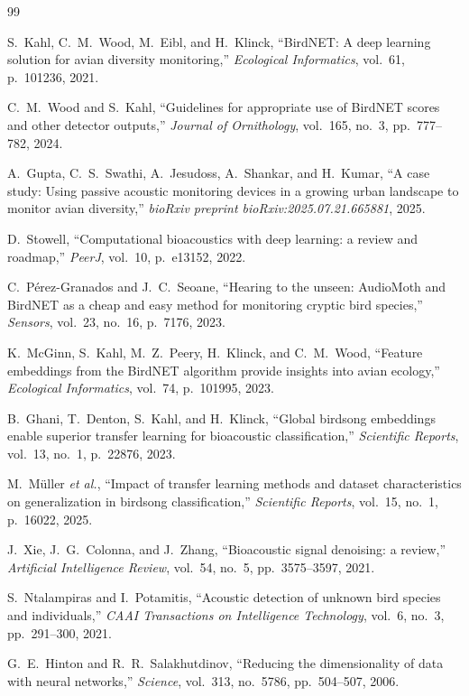 \documentclass[a4paper,12pt]{article}
\begin{document}
\begin{thebibliography}{99}

S.~Kahl, C.~M.~Wood, M.~Eibl, and H.~Klinck,
``BirdNET: A deep learning solution for avian diversity monitoring,''
\textit{Ecological Informatics}, vol.~61, p.~101236, 2021.

C.~M.~Wood and S.~Kahl,
``Guidelines for appropriate use of BirdNET scores and other detector outputs,''
\textit{Journal of Ornithology}, vol.~165, no.~3, pp.~777--782, 2024.

A.~Gupta, C.~S.~Swathi, A.~Jesudoss, A.~Shankar, and H.~Kumar,
``A case study: Using passive acoustic monitoring devices in a growing urban landscape
to monitor avian diversity,''
\textit{bioRxiv preprint bioRxiv:2025.07.21.665881}, 2025.

D.~Stowell,
``Computational bioacoustics with deep learning: a review and roadmap,''
\textit{PeerJ}, vol.~10, p.~e13152, 2022.

C.~P\'erez-Granados and J.~C.~Seoane,
``Hearing to the unseen: AudioMoth and BirdNET as a cheap and easy method for monitoring
cryptic bird species,''
\textit{Sensors}, vol.~23, no.~16, p.~7176, 2023.

K.~McGinn, S.~Kahl, M.~Z.~Peery, H.~Klinck, and C.~M.~Wood,
``Feature embeddings from the BirdNET algorithm provide insights into avian ecology,''
\textit{Ecological Informatics}, vol.~74, p.~101995, 2023.

B.~Ghani, T.~Denton, S.~Kahl, and H.~Klinck,
``Global birdsong embeddings enable superior transfer learning for bioacoustic classification,''
\textit{Scientific Reports}, vol.~13, no.~1, p.~22876, 2023.

M.~M\"{u}ller \textit{et al.},
``Impact of transfer learning methods and dataset characteristics on generalization in
birdsong classification,''
\textit{Scientific Reports}, vol.~15, no.~1, p.~16022, 2025.

J.~Xie, J.~G.~Colonna, and J.~Zhang,
``Bioacoustic signal denoising: a review,''
\textit{Artificial Intelligence Review}, vol.~54, no.~5, pp.~3575--3597, 2021.

S.~Ntalampiras and I.~Potamitis,
``Acoustic detection of unknown bird species and individuals,''
\textit{CAAI Transactions on Intelligence Technology}, vol.~6, no.~3, pp.~291--300, 2021.

G.~E.~Hinton and R.~R.~Salakhutdinov,
``Reducing the dimensionality of data with neural networks,''
\textit{Science}, vol.~313, no.~5786, pp.~504--507, 2006.


\end{thebibliography}
\end{document}
